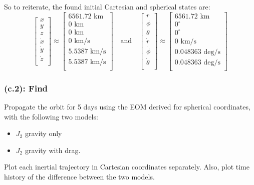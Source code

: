 \documentclass[titlepage]{article}
\begin{document}
\begin{mdframed}[linewidth=1pt, innertopmargin=10pt, innerbottommargin=10pt]
	So to reiterate, the found initial Cartesian and spherical states are:
	\begin{equation}
		\begin{bmatrix}
			x \\
			y \\
			z \\
			\dot{x} \\
			\dot{y} \\
			\dot{z} \\
		\end{bmatrix}
		\approx
		\begin{bmatrix}
			6561.72\text{ km} \\
			0\text{ km} \\
			0\text{ km} \\
			0\text{ km/s} \\
			5.5387\text{ km/s} \\
			5.5387\text{ km/s} \\
		\end{bmatrix}
		\quad\text{and}\quad
		\begin{bmatrix}
			r \\
			\phi \\
			\theta \\
			\dot{r} \\
			\dot{\phi} \\
			\dot{\theta} \\
		\end{bmatrix}
		\approx
		\begin{bmatrix}
			6561.72\text{ km} \\
			0^\circ \\
			0^\circ \\
			0\text{ km/s} \\
			0.048363\text{ deg/s} \\
			0.048363\text{ deg/s} \\
		\end{bmatrix}
		\label{eq:initialcons}
	\end{equation}
\end{mdframed}

\subsubsection*{(c.2): Find}

Propagate the orbit for 5 days using the EOM derived for spherical coordinates, with the following two models:
\begin{itemize}
	\item $J_2$ gravity only
	\item $J_2$ gravity with drag.
\end{itemize}
Plot each inertial trajectory in Cartesian coordinates separately. Also, plot time history of the difference between the two models.\\
\end{document}

